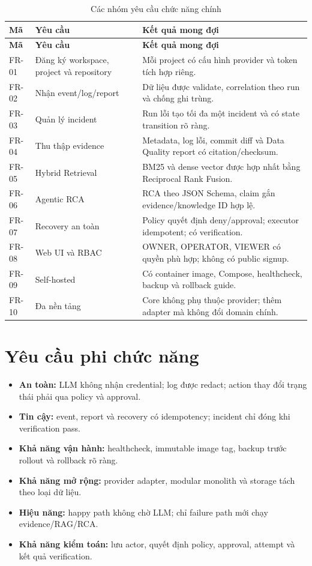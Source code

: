 \documentclass[12pt,a4paper,oneside]{report}
\begin{document}
\begin{longtable}{L{1.3cm} L{6.0cm} L{6.5cm}}
\caption{Các nhóm yêu cầu chức năng chính}\label{tab:functional-requirements}\\
\toprule
\textbf{Mã} & \textbf{Yêu cầu} & \textbf{Kết quả mong đợi} \\
\midrule
\endfirsthead
\toprule
\textbf{Mã} & \textbf{Yêu cầu} & \textbf{Kết quả mong đợi} \\
\midrule
\endhead
FR-01 & Đăng ký workspace, project và repository & Mỗi project có cấu hình provider và token tích hợp riêng. \\
FR-02 & Nhận event/log/report & Dữ liệu được validate, correlation theo run và chống ghi trùng. \\
FR-03 & Quản lý incident & Run lỗi tạo tối đa một incident và có state transition rõ ràng. \\
FR-04 & Thu thập evidence & Metadata, log lỗi, commit diff và Data Quality report có citation/checksum. \\
FR-05 & Hybrid Retrieval & BM25 và dense vector được hợp nhất bằng Reciprocal Rank Fusion. \\
FR-06 & Agentic RCA & RCA theo JSON Schema, claim gắn evidence/knowledge ID hợp lệ. \\
FR-07 & Recovery an toàn & Policy quyết định deny/approval; executor idempotent; có verification. \\
FR-08 & Web UI và RBAC & OWNER, OPERATOR, VIEWER có quyền phù hợp; không có public signup. \\
FR-09 & Self-hosted & Có container image, Compose, healthcheck, backup và rollback guide. \\
FR-10 & Đa nền tảng & Core không phụ thuộc provider; thêm adapter mà không đổi domain chính. \\
\bottomrule
\end{longtable}

\section{Yêu cầu phi chức năng}

\begin{itemize}
  \item \textbf{An toàn:} LLM không nhận credential; log được redact; action thay đổi trạng thái
  phải qua policy và approval.
  \item \textbf{Tin cậy:} event, report và recovery có idempotency; incident chỉ đóng khi
  verification pass.
  \item \textbf{Khả năng vận hành:} healthcheck, immutable image tag, backup trước rollout và
  rollback rõ ràng.
  \item \textbf{Khả năng mở rộng:} provider adapter, modular monolith và storage tách theo loại
  dữ liệu.
  \item \textbf{Hiệu năng:} happy path không chờ LLM; chỉ failure path mới chạy evidence/RAG/RCA.
  \item \textbf{Khả năng kiểm toán:} lưu actor, quyết định policy, approval, attempt và kết quả
  verification.
\end{itemize}
\end{document}
